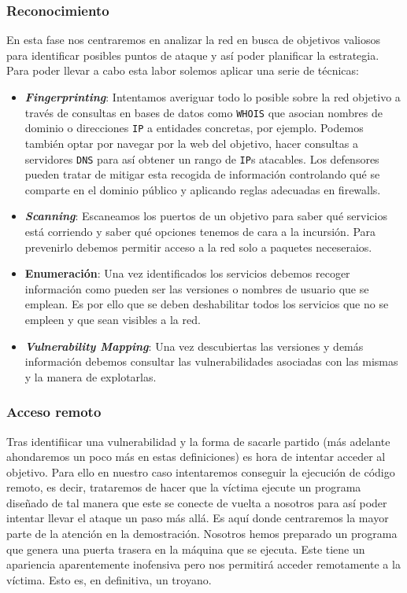\documentclass[12pt]{article}
\begin{document}
            \subsubsection{Reconocimiento}
                En esta fase nos centraremos en analizar la red en busca de objetivos valiosos para identificar posibles puntos de ataque y así poder planificar la estrategia. Para poder llevar a cabo esta labor solemos aplicar una serie de técnicas:

                \begin{itemize}
                    \item \textbf{\textit{Fingerprinting}}: Intentamos averiguar todo lo posible sobre la red objetivo a través de consultas en bases de datos como \texttt{WHOIS} que asocian nombres de dominio o direcciones \texttt{IP} a entidades concretas, por ejemplo. Podemos también optar por navegar por la web del objetivo, hacer consultas a servidores \texttt{DNS} para así obtener un rango de \texttt{IP}s atacables. Los defensores pueden tratar de mitigar esta recogida de información controlando qué se comparte en el dominio público y aplicando reglas adecuadas en firewalls.
                    \item \textbf{\textit{Scanning}}: Escaneamos los puertos de un objetivo para saber qué servicios está corriendo y saber qué opciones tenemos de cara a la incursión. Para prevenirlo debemos permitir acceso a la red solo a paquetes neceseraios.
                   \item \textbf{Enumeración}: Una vez identificados los servicios debemos recoger información como pueden ser las versiones o nombres de usuario que se emplean. Es por ello que se deben deshabilitar todos los servicios que no se empleen y que sean visibles a la red.
                   \item \textbf{\textit{Vulnerability Mapping}}: Una vez descubiertas las versiones y demás información debemos consultar las vulnerabilidades asociadas con las mismas y la manera de explotarlas.
                \end{itemize}

            \subsubsection{Acceso remoto}
                Tras identifiicar una vulnerabilidad y la forma de sacarle partido (más adelante ahondaremos un poco más en estas definiciones) es hora de intentar acceder al objetivo. Para ello en nuestro caso intentaremos conseguir la ejecución de código remoto, es decir, trataremos de hacer que la víctima ejecute un programa diseñado de tal manera que este se conecte de vuelta a nosotros para así poder intentar llevar el ataque un paso más allá. Es aquí donde centraremos la mayor parte de la atención en la demostración. Nosotros hemos preparado un programa que genera una puerta trasera en la máquina que se ejecuta. Este tiene un apariencia aparentemente inofensiva pero nos permitirá acceder remotamente a la víctima. Esto es, en definitiva, un troyano.
\end{document}

